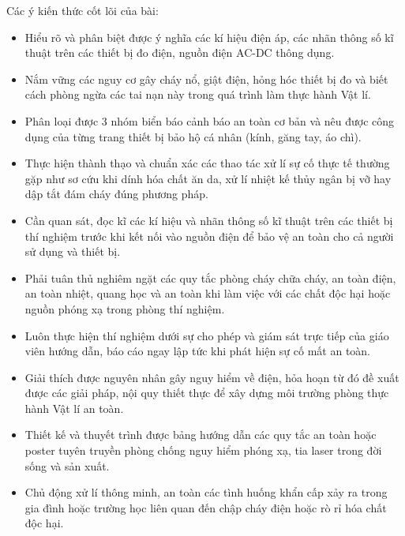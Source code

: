 \begin{kienthuc}
Các ý kiến thức cốt lõi của bài:
\begin{itemize}
\item Hiểu rõ và phân biệt được ý nghĩa các kí hiệu điện áp, các nhãn thông số kĩ thuật trên các thiết bị đo điện, nguồn điện AC-DC thông dụng.
\item Nắm vững các nguy cơ gây cháy nổ, giật điện, hỏng hóc thiết bị đo và biết cách phòng ngừa các tai nạn này trong quá trình làm thực hành Vật lí.
\item Phân loại được 3 nhóm biển báo cảnh báo an toàn cơ bản và nêu được công dụng của từng trang thiết bị bảo hộ cá nhân (kính, găng tay, áo chì).
\item Thực hiện thành thạo và chuẩn xác các thao tác xử lí sự cố thực tế thường gặp như sơ cứu khi dính hóa chất ăn da, xử lí nhiệt kế thủy ngân bị vỡ hay dập tắt đám cháy đúng phương pháp.
\end{itemize}
\end{kienthuc}

\begin{emdahoc}
\begin{itemize}
\item Cần quan sát, đọc kĩ các kí hiệu và nhãn thông số kĩ thuật trên các thiết bị thí nghiệm trước khi kết nối vào nguồn điện để bảo vệ an toàn cho cả người sử dụng và thiết bị.
\item Phải tuân thủ nghiêm ngặt các quy tắc phòng cháy chữa cháy, an toàn điện, an toàn nhiệt, quang học và an toàn khi làm việc với các chất độc hại hoặc nguồn phóng xạ trong phòng thí nghiệm.
\item Luôn thực hiện thí nghiệm dưới sự cho phép và giám sát trực tiếp của giáo viên hướng dẫn, báo cáo ngay lập tức khi phát hiện sự cố mất an toàn.
\end{itemize}
\end{emdahoc}

\begin{emcothe}
\begin{itemize}
\item Giải thích được nguyên nhân gây nguy hiểm về điện, hỏa hoạn từ đó đề xuất được các giải pháp, nội quy thiết thực để xây dựng môi trường phòng thực hành Vật lí an toàn.
\item Thiết kế và thuyết trình được bảng hướng dẫn các quy tắc an toàn hoặc poster tuyên truyền phòng chống nguy hiểm phóng xạ, tia laser trong đời sống và sản xuất.
\item Chủ động xử lí thông minh, an toàn các tình huống khẩn cấp xảy ra trong gia đình hoặc trường học liên quan đến chập cháy điện hoặc rò rỉ hóa chất độc hại.
\end{itemize}
\end{emcothe}
